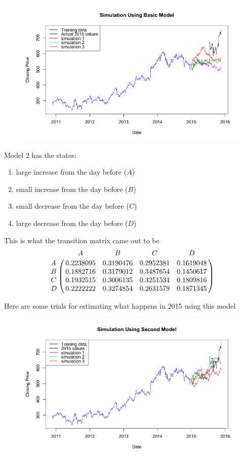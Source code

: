 \documentclass[12pt]{article}
\begin{document}
\begin{figure}[hb]
\centering
\includegraphics[width=5.5in]{basic_model.png}
\end{figure}

\newpage
Model 2 has the states:
\begin{enumerate}
\item large increase from the day before ($A$)
\item small increase from the day before ($B$)
\item small decrease from the day before ($C$)
\item large decrease from the day before ($D$)
\end{enumerate}
This is what the transition matrix came out to be
$$
\bordermatrix{~ & A & B & C & D \cr
                  A & 0.2238095 & 0.3190476 & 0.2952381 & 0.1619048 \cr
		 B & 0.1882716 & 0.3179012 & 0.3487654 & 0.1450617 \cr
	         C & 0.1932515 & 0.3006135 & 0.3251534 & 0.1809816 \cr
		 D & 0.2222222 & 0.3274854 & 0.2631579 & 0.1871345 \cr}
$$

Here are some trials for estimating what happens in 2015 using this model

\begin{figure}[hb]
\centering
\includegraphics[width=5.5in]{model_2.png}
\end{figure}
\end{document}
